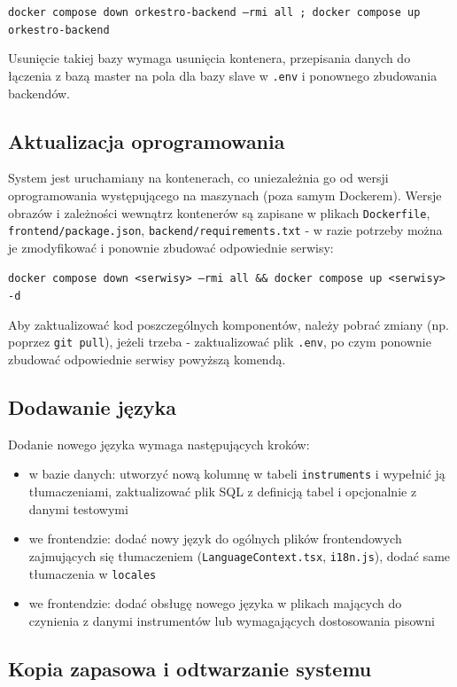 \documentclass[11pt,a4paper]{article}
\renewcommand{\_}{\char`_}
\begin{document}
\texttt{docker compose down orkestro-backend --rmi all ; docker compose up orkestro-backend}

Usunięcie takiej bazy wymaga usunięcia kontenera, przepisania danych do łączenia z bazą master na pola dla bazy slave w \texttt{.env} i ponownego zbudowania backendów.

\subsection{Aktualizacja oprogramowania}

System jest uruchamiany na kontenerach, co uniezależnia go od wersji oprogramowania występującego na maszynach (poza samym Dockerem). Wersje obrazów i zależności wewnątrz kontenerów są zapisane w plikach \texttt{Dockerfile}, \texttt{frontend/package.json}, \texttt{backend/requirements.txt} - w razie potrzeby można je zmodyfikować i ponownie zbudować odpowiednie serwisy:

\texttt{docker compose down <serwisy> --rmi all \&\& docker compose up <serwisy> -d}

Aby zaktualizować kod poszczególnych komponentów, należy pobrać zmiany (np. poprzez \texttt{git pull}), jeżeli trzeba - zaktualizować plik \texttt{.env}, po czym ponownie zbudować odpowiednie serwisy powyższą komendą.  

\subsection{Dodawanie języka}
Dodanie nowego języka wymaga następujących kroków:
\begin{itemize}
    \item w bazie danych: utworzyć nową kolumnę w tabeli \texttt{instruments} i wypełnić ją tłumaczeniami, zaktualizować plik SQL z definicją tabel i opcjonalnie z danymi testowymi
    \item we frontendzie: dodać nowy język do ogólnych plików frontendowych zajmujących się tłumaczeniem (\texttt{LanguageContext.tsx}, \texttt{i18n.js}), dodać same tłumaczenia w \texttt{locales}
    \item we frontendzie: dodać obsługę nowego języka w plikach mających do czynienia z danymi instrumentów lub wymagających dostosowania pisowni
\end{itemize}

\subsection{Kopia zapasowa i odtwarzanie systemu}
\end{document}
